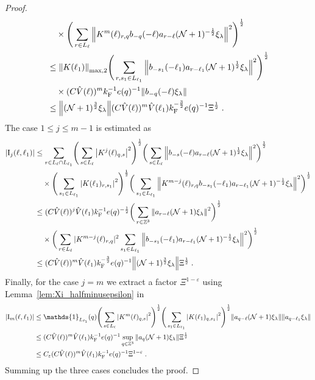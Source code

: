 \documentclass[12pt,a4paper]{article}
\numberwithin{equation}{section}
\newcommand{\1}{\mathbb{I}}
\newcommand{\F}{\mathrm{F}}
\newcommand{\I}{\mathrm{I}}
\newcommand{\Z}{\mathbb{Z}}
\newcommand{\NN}{\mathcal{N}}
\newcommand{\half}{\frac{1}{2}}
\theoremstyle{plain}
\theoremstyle{definition}
\theoremstyle{remark}
\theoremstyle{plain}
\theoremstyle{definition}
\theoremstyle{remark}
\begin{document}
\begin{proof}
\begin{align}
 	&\quad \times \Bigg( \sum_{r \in L_\ell} \norm{K^{m}(\ell)_{r,q} b_{-q}(-\ell) a_{r-\ell} (\NN+1)^{-\half}\xi_\lambda }^2\Bigg)^\half \nonumber\\
 	&\leq \norm{K(\ell_1)}_{\mathrm{max,2}} \Bigg(
 		\sum_{r, s_1 \in L_{\ell_1}} \norm{ b_{-s_1}(-\ell_1) a_{r-\ell_1} (\NN+1)^{\half}\xi_\lambda}^2\Bigg)^\half \nonumber\\
 	&\quad \times (C \hat{V}(\ell))^m k_{\F}^{-1} e(q)^{-1} \norm{b_{-q}(-\ell) \xi_\lambda } \nonumber\\
 	&\leq \norm{ (\NN+1)^{\frac{3}{2}}\xi_\lambda}
 		(C \hat{V}(\ell))^m
 		\hat{V}(\ell_1)
 		k_{\F}^{-\frac 32} e(q)^{-1} \Xi^{\half} \;. \label{eq:estEQ2111} 
\end{align}
The case $ 1 \le j \le m-1 $ is estimated as
\begin{align}
	|\I_j(\ell, \ell_1)|
	&\leq \sum_{r\in L_{\ell} \cap L_{\ell_1}}\! \Bigg( \sum_{s \in L_\ell} \abs{K^{j}(\ell)_{q,s}}^2\Bigg)^\half \bigg( \sum_{s \in L_\ell}\norm{b_{-s}(-\ell) a_{r-\ell} (\NN+1)^{\half}\xi_\lambda}^2\bigg)^\half \nonumber\\
		&\quad \times \Bigg( \sum_{s_1 \in L_{\ell_1}}\abs{K(\ell_1)_{r,s_1}}^2\Bigg)^\half \bigg(\sum_{s_1 \in L_{\ell_1}}\norm{ K^{m-j}(\ell)_{r,q} b_{-s_1}(-\ell_1)  a_{r-\ell_1} (\NN+1)^{-\half}\xi_\lambda }^2\bigg)^\half
	\nonumber\\
	&\leq (C \hat{V}(\ell))^j \hat{V}(\ell_1) k_{\F}^{-1} e(q)^{-\half}
	\bigg( \sum_{r\in \Z^3} \norm{ a_{r-\ell} (\NN+1) \xi_\lambda}^2\bigg)^\half  \nonumber\\
		&\quad \times 
	\bigg(\sum_{r\in L_{\ell}} |K^{m-j}(\ell)_{r,q} |^2
		\sum_{s_1 \in L_{\ell_1}}\norm{ b_{-s_1}(-\ell_1) a_{r-\ell_1} (\NN+1)^{-\half}\xi_\lambda }^2\bigg)^\half
	\nonumber\\
	&\leq (C \hat{V}(\ell))^m
		\hat{V}(\ell_1)
		k_{\F}^{-\frac 32} e(q)^{-1}
		\norm{ (\NN+1)^{\frac 32}\xi_\lambda } \Xi^{\half} \;. \label{eq:estEQ2112}
\end{align}
Finally, for the case $ j = m $ we extract a factor $ \Xi^{1-\varepsilon} $ using Lemma~\ref{lem:Xi_halfminusepsilon} in
\begin{align}
	|\I_m(\ell, \ell_1)|
	&\leq \mathds{1}_{L_{\ell_1}}(q) \Bigg(\sum_{s \in L_{\ell}} \abs{K^m(\ell)_{q,s}}^2\Bigg)^\half
		\Bigg(\sum_{s_1 \in L_{\ell_1}} \abs{K(\ell_1)_{q,s_1}}^2\Bigg)^\half
		\norm{ a_{q-\ell} (\NN+1) \xi_\lambda}
		\norm{ a_{q-\ell_1} \xi_\lambda }\nonumber\\
	&\leq (C \hat{V}(\ell))^m \hat{V}(\ell_1) k_{\F}^{-1} e(q)^{-1}
		\sup_{q \in \Z^3} \norm{ a_q (\NN+1) \xi_\lambda }\Xi^{\half} \nonumber\\
	&\leq C_\varepsilon (C \hat{V}(\ell))^m
		\hat{V}(\ell_1)
		k_{\F}^{-1} e(q)^{-1} \Xi^{1-\varepsilon} \;. \label{eq:estEQ2113}
\end{align}
Summing up the three cases concludes the proof.
\end{proof}
\end{document}
